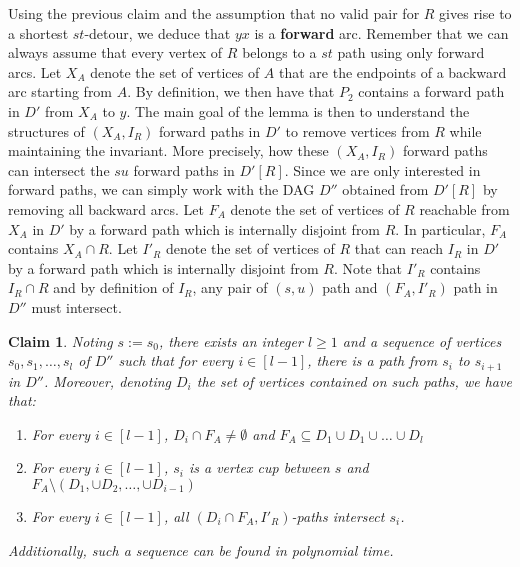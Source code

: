 \documentclass[utf8,11pt]{article}
\theoremstyle{plain}
\newtheorem{claim}{Claim}[theorem]
\theoremstyle{definition}
\begin{document}
Using the previous claim and the assumption that no valid pair for $R$ gives rise to a shortest $st$-detour, we deduce that $yx$ is a \textbf{forward} arc. Remember that we can always assume that every vertex of $R$ belongs to a $st$ path using only forward arcs. Let $X_A$ denote the set of vertices of $A$ that are the endpoints of a backward arc starting from $A$. By definition, we then have that $P_2$ contains a forward path in $D'$ from $X_A$ to $y$. The main goal of the lemma is then to understand the structures of $(X_A, I_R)$ forward paths in $D'$ to remove vertices from $R$ while maintaining the invariant. More precisely, how these $(X_A, I_R)$ forward paths can intersect the $su$ forward paths in $D'[R]$. Since we are only interested in forward paths, we can simply work with the DAG $D''$ obtained from $D'[R]$ by removing all backward arcs. Let $F_A$ denote the set of vertices of $R$ reachable from $X_A$ in $D'$ by a forward path which is internally disjoint from $R$. In particular, $F_A$ contains $X_A \cap R$. Let $I'_R$ denote the set of vertices of $R$ that can reach $I_R$ in $D'$ by a forward path which is internally disjoint from $R$. Note that $I'_R$ contains $I_R \cap R$ and by definition of $I_R$, any pair of $(s,u)$ path and $(F_A,I'_R)$ path in $D''$ must intersect. 


\begin{claim}\label{claim:grid}
    Noting $s := s_0$, there exists an integer $l \geq 1$ and a sequence of vertices $s_0, s_1, \dots, s_l$ of $D''$ such that for every $i \in [l-1]$, there is a path from $s_i$ to $s_{i+1}$ in $D''$. Moreover, denoting $D_i$ the set of vertices contained on such paths, we have that: 
    \begin{enumerate}
        \item For every $i \in [l-1]$, $D_i \cap F_A \neq \emptyset$ and $F_A \subseteq D_1 \cup D_1 \cup \dots \cup D_{l}$
        \item For every $i \in [l-1]$, $s_i$ is a vertex cup between $s$ and $F_A \setminus (D_1, \cup D_2, \dots, \cup D_{i-1})$
        \item For every $i \in [l-1]$, all $(D_i\cap F_A,I'_R)$-paths intersect $s_i$.
    \end{enumerate}
    Additionally, such a sequence can be found in polynomial time.
\end{claim}
\end{document}
